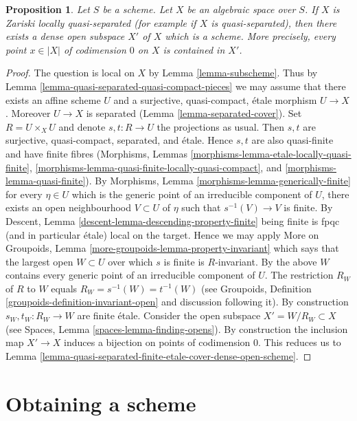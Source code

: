 \documentclass{stacks-project}
\theoremstyle{plain}
\newtheorem{proposition}[subsection]{Proposition}
\theoremstyle{definition}
\theoremstyle{remark}
\numberwithin{equation}{subsection}
\begin{document}
\begin{proposition}
\label{proposition-locally-quasi-separated-open-dense-scheme}
Let $S$ be a scheme. Let $X$ be an algebraic space over $S$. If $X$ is
Zariski locally quasi-separated (for example if $X$ is quasi-separated), then
there exists a dense open subspace $X'$ of $X$ which is a scheme.
More precisely, every point $x \in |X|$ of codimension $0$ on $X$
is contained in $X'$.
\end{proposition}

\begin{proof}
The question is local on $X$ by Lemma \ref{lemma-subscheme}.
Thus by Lemma \ref{lemma-quasi-separated-quasi-compact-pieces}
we may assume that there exists an affine scheme $U$ and a
surjective, quasi-compact, \'etale morphism $U \to X$.
Moreover $U \to X$ is separated (Lemma \ref{lemma-separated-cover}).
Set $R = U \times_X U$ and denote $s, t : R \to U$ the projections
as usual. Then $s, t$ are surjective, quasi-compact, separated, and
\'etale. Hence $s, t$ are also quasi-finite and have finite fibres
(Morphisms,
Lemmas \ref{morphisms-lemma-etale-locally-quasi-finite},
\ref{morphisms-lemma-quasi-finite-locally-quasi-compact}, and
\ref{morphisms-lemma-quasi-finite}).
By Morphisms, Lemma \ref{morphisms-lemma-generically-finite}
for every $\eta \in U$ which is the generic point of an
irreducible component of $U$, there exists an open neighbourhood
$V \subset U$ of $\eta$ such that $s^{-1}(V) \to V$ is finite. By
Descent, Lemma \ref{descent-lemma-descending-property-finite}
being finite is fpqc (and in particular \'etale) local on the target.
Hence we may apply
More on Groupoids, Lemma \ref{more-groupoids-lemma-property-invariant}
which says that the largest open $W \subset U$ over which $s$ is
finite is $R$-invariant. By the above $W$ contains every
generic point of an irreducible component of $U$.
The restriction $R_W$ of $R$ to $W$ equals $R_W = s^{-1}(W) = t^{-1}(W)$
(see Groupoids, Definition \ref{groupoids-definition-invariant-open}
and discussion following it).
By construction $s_W, t_W : R_W \to W$ are finite \'etale.
Consider the open subspace $X' = W/R_W \subset X$ (see
Spaces, Lemma \ref{spaces-lemma-finding-opens}).
By construction the inclusion map $X' \to X$
induces a bijection on points of codimension $0$.
This reduces us to
Lemma \ref{lemma-quasi-separated-finite-etale-cover-dense-open-scheme}.
\end{proof}




\section{Obtaining a scheme}
\label{section-getting-a-scheme}
\end{document}
